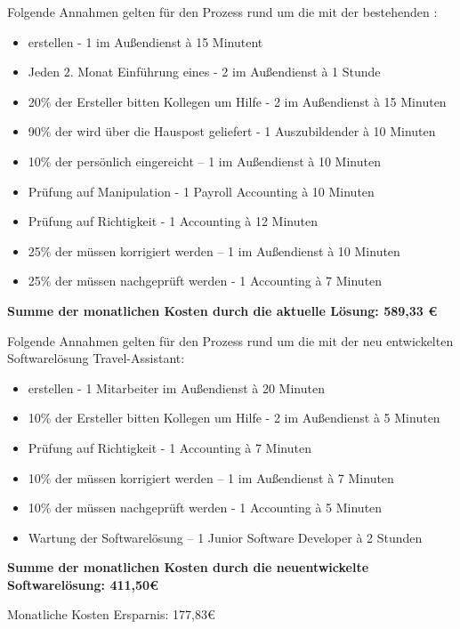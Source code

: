 Folgende Annahmen gelten für den Prozess rund um die  mit der bestehenden :
\begin{itemize}
\item {} erstellen - 1  im Außendienst à 15 Minutent
\item Jeden 2. Monat Einführung eines  - 2  im Außendienst à 1 Stunde
\item 20\% der Ersteller bitten Kollegen um Hilfe - 2  im Außendienst à 15 Minuten
\item 90\% der  wird über die Hauspost geliefert - 1 Auszubildender à 10 Minuten
\item 10\% der  persönlich eingereicht – 1  im Außendienst à 10 Minuten
\item Prüfung auf Manipulation - 1  Payroll Accounting à 10 Minuten
\item Prüfung auf Richtigkeit - 1  Accounting à 12 Minuten
\item 25\% der  müssen korrigiert werden – 1  im Außendienst à 10 Minuten
\item 25\% der  müssen nachgeprüft werden - 1  Accounting à 7 Minuten
\end{itemize}

\textbf{Summe der monatlichen Kosten durch die aktuelle Lösung: 589,33 €}

Folgende Annahmen gelten für den Prozess rund um die  mit der neu entwickelten Softwarelösung Travel-Assistant:
\begin{itemize}
\item {} erstellen - 1 Mitarbeiter im Außendienst à 20 Minuten
\item 10\% der Ersteller bitten Kollegen um Hilfe - 2  im Außendienst à 5 Minuten
\item Prüfung auf Richtigkeit - 1  Accounting à 7 Minuten
\item 10\% der  müssen korrigiert werden – 1  im Außendienst à 7 Minuten
\item 10\% der  müssen nachgeprüft werden - 1  Accounting à 5 Minuten
\item Wartung der Softwarelösung – 1 Junior Software Developer à 2 Stunden
\end{itemize}

\textbf{Summe der monatlichen Kosten durch die neuentwickelte Softwarelösung: 411,50€}

Monatliche Kosten Ersparnis: 177,83€

